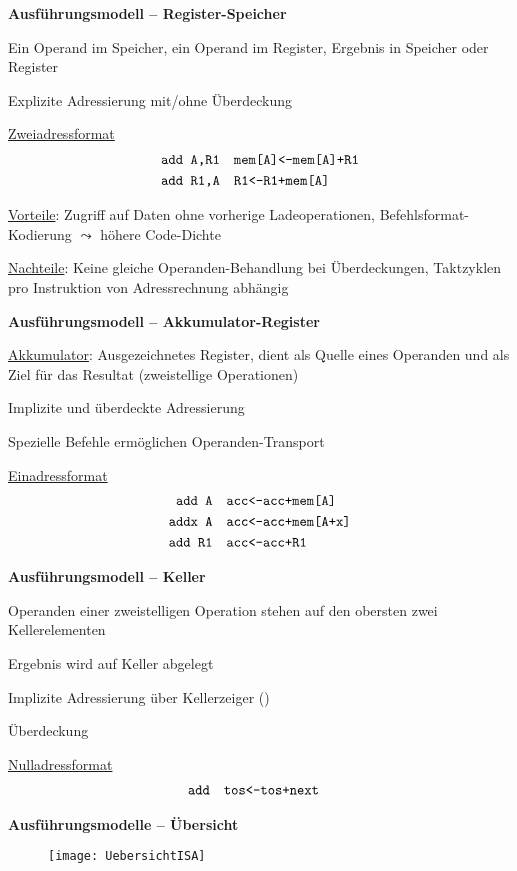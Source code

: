 \textbf{Ausführungsmodell -- Register-Speicher}
\begin{items}
	\item Ein Operand im Speicher, ein Operand im Register, Ergebnis in Speicher oder Register
	\item Explizite Adressierung mit/ohne Überdeckung
	\item \underline{Zweiadressformat}
	\begin{align*}
		\text{\code{add A,R1}} &\quad \text{\code{mem[A]<-mem[A]+R1}} \\
		\text{\code{add R1,A}} &\quad \text{\code{R1<-R1+mem[A]}}
	\end{align*}
	\item \underline{Vorteile}: Zugriff auf Daten ohne vorherige Ladeoperationen, Befehlsformat-Kodierung $\leadsto$ höhere Code-Dichte
	\item \underline{Nachteile}: Keine gleiche Operanden-Behandlung bei Überdeckungen, Taktzyklen pro Instruktion von Adressrechnung abhängig
\end{items}

\newpage

\textbf{Ausführungsmodell -- Akkumulator-Register}
\begin{items}
	\item \underline{Akkumulator}: Ausgezeichnetes Register, dient als Quelle eines Operanden und als Ziel für das Resultat (zweistellige Operationen)
	\item Implizite und überdeckte Adressierung
	\item Spezielle Befehle ermöglichen Operanden-Transport
	\item \underline{Einadressformat}
	\begin{align*}
		\text{\code{add A}} &\quad \text{\code{acc<-acc+mem[A]}} \\
		\text{\code{addx A}} &\quad \text{\code{acc<-acc+mem[A+x]}} \\
		\text{\code{add R1}} &\quad \text{\code{acc<-acc+R1}}
	\end{align*}
\end{items}

\textbf{Ausführungsmodell -- Keller}
\begin{items}
	\item Operanden einer zweistelligen Operation stehen auf den obersten zwei Kellerelementen
	\item Ergebnis wird auf Keller abgelegt
	\item Implizite Adressierung über Kellerzeiger ()
	\item Überdeckung
	\item \underline{Nulladressformat}
	\begin{align*}
		\text{\code{add}} &\quad \text{\code{tos<-tos+next}}
	\end{align*}
\end{items}

\textbf{Ausführungsmodelle -- Übersicht} \\
\begin{items}
	\item 
	\begin{center}
	\end{center}
	\begin{figure}[ht]
	  \centering
	  \texttt{[image: UebersichtISA]}
	  \label{UebersichtISA}
	\end{figure}
\end{items}